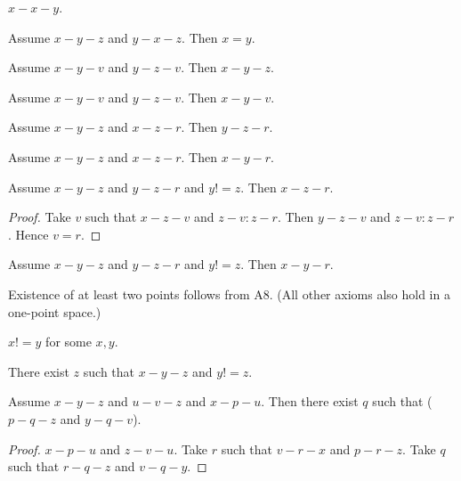 \documentclass{article}
\begin{document}
  \begin{forthel}
    \begin{lemma}[L3o3]
      $x-x-y$.
    \end{lemma}

    \begin{lemma}[L3o4]
      Assume $x-y-z$ and $y-x-z$. Then $x = y$.
    \end{lemma}

    \begin{lemma}[L3o5a]
      Assume $x-y-v$ and $y-z-v$. Then $x-y-z$.
    \end{lemma}

    \begin{lemma}[L3o5b]
      Assume $x-y-v$ and $y-z-v$. Then $x-y-v$.
    \end{lemma}

    \begin{lemma}[L3o6a]
      Assume $x-y-z$ and $x-z-r$. Then $y-z-r$.
    \end{lemma}

    \begin{lemma}[L3o6b]
      Assume $x-y-z$ and $x-z-r$. Then $x-y-r$.
    \end{lemma}

    \begin{lemma}[L3o7a]
      Assume $x-y-z$ and $y-z-r$ and $y != z$. Then $x-z-r$.
    \end{lemma}
    \begin{proof}
    	Take $v$ such that $x-z-v$ and $z-v : z-r$.	Then $y-z-v$ and $z-v : z-r$. Hence $v = r$.
    \end{proof}

    \begin{lemma}[L3o7b]
      Assume $x-y-z$ and $y-z-r$ and $y != z$. Then $x-y-r$.
    \end{lemma}
  \end{forthel}

  Existence of at least two points follows from A8. (All other axioms also hold in a one-point space.)

  \begin{forthel}
    \begin{lemma}[L3o13]
      $x != y$ for some $x, y$.
    \end{lemma}

    \begin{lemma}[L3o14]
      There exist $z$ such that $x-y-z$ and $y != z$.
    \end{lemma}

    \begin{lemma}[L3o17]
      Assume $x-y-z$ and $u-v-z$ and $x-p-u$. Then there exist $q$ such that ($p-q-z$ and $y-q-v$).
    \end{lemma}
    \begin{proof}
      $x-p-u$ and $z-v-u$.
    	Take $r$ such that $v-r-x$ and $p-r-z$. %
    	Take $q$ such that $r-q-z$ and $v-q-y$. %
    \end{proof}
  \end{forthel}
\end{document}
